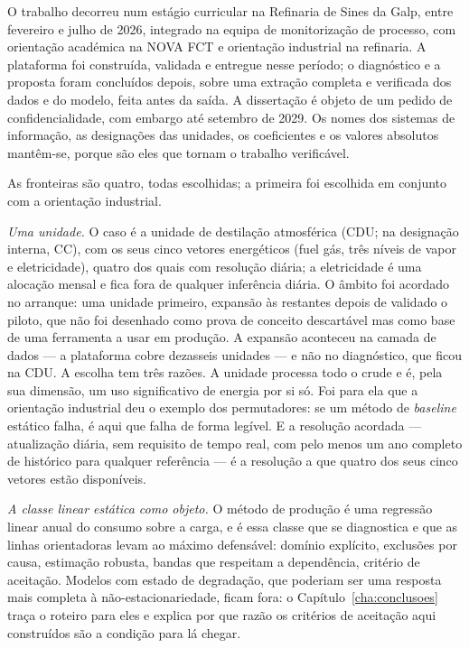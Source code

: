 O trabalho decorreu num estágio curricular na Refinaria de Sines da
Galp, entre fevereiro e julho de 2026, integrado na equipa de
monitorização de processo, com orientação académica na NOVA FCT e
orientação industrial na refinaria. A
plataforma foi construída, validada e entregue nesse período; o
diagnóstico e a proposta foram concluídos depois, sobre uma extração
completa e verificada dos dados e do modelo, feita antes da saída. A
dissertação é objeto de um pedido de confidencialidade, com embargo até
setembro de 2029. Os nomes dos sistemas de informação, as designações
das unidades, os coeficientes e os valores absolutos mantêm-se, porque
são eles que tornam o trabalho verificável.

As fronteiras são quatro, todas escolhidas; a primeira foi escolhida em
conjunto com a orientação industrial.

\emph{Uma unidade.} O caso é a unidade de destilação atmosférica (CDU;
na designação interna, CC), com os seus cinco vetores energéticos (fuel
gás, três níveis de vapor e eletricidade), quatro dos quais com
resolução diária; a eletricidade é uma alocação mensal e fica fora de
qualquer inferência diária. O âmbito foi acordado no arranque: uma
unidade primeiro, expansão às restantes depois de validado o piloto, que
não foi desenhado como prova de conceito descartável mas como base de
uma ferramenta a usar em produção. A expansão aconteceu na camada de
dados --- a plataforma cobre dezasseis unidades --- e não no diagnóstico,
que ficou na CDU. A escolha tem três razões. A unidade processa todo o
crude e é, pela sua dimensão, um uso significativo de energia por si
só. Foi para ela que a orientação industrial deu o exemplo dos
permutadores: se um método de \emph{baseline} estático falha, é aqui que
falha de forma legível. E a resolução acordada --- atualização diária,
sem requisito de tempo real, com pelo menos um ano completo de histórico
para qualquer referência --- é a resolução a que quatro dos seus cinco
vetores estão disponíveis.

\emph{A classe linear estática como objeto.} O método de produção é uma
regressão linear anual do consumo sobre a carga, e é essa classe que se
diagnostica e que as linhas orientadoras levam ao máximo defensável:
domínio explícito, exclusões por causa, estimação robusta, bandas que
respeitam a dependência, critério de aceitação. Modelos com estado de
degradação, que poderiam ser uma resposta mais completa à não-estacionariedade,
ficam fora: o Capítulo~\ref{cha:conclusoes} traça o roteiro para eles e
explica por que razão os critérios de aceitação aqui construídos são a
condição para lá chegar.

